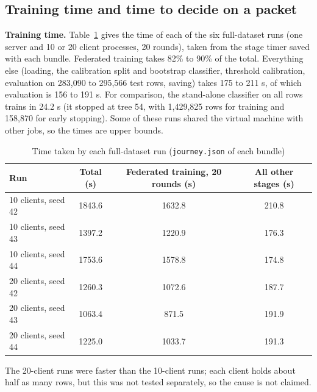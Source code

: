 \subsection{Training time and time to decide on a packet}\label{sec:speed}
\textbf{Training time.} Table~\ref{tab:traintime} gives the time of each of the six full-dataset runs (one server and 10 or 20 client processes, 20 rounds), taken from the stage timer saved with each bundle. Federated training takes 82\% to 90\% of the total. Everything else (loading, the calibration split and bootstrap classifier, threshold calibration, evaluation on 283{,}090 to 295{,}566 test rows, saving) takes 175 to 211 s, of which evaluation is 156 to 191 s. For comparison, the stand-alone classifier on all rows trains in 24.2 s (it stopped at tree 54, with 1{,}429{,}825 rows for training and 158{,}870 for early stopping). Some of these runs shared the virtual machine with other jobs, so the times are upper bounds.
\begin{table}[H]
\centering
\small
\renewcommand{\arraystretch}{1.15}
\begin{tabular}{|l|c|c|c|}
\hline
\textbf{Run} & \textbf{Total (s)} & \textbf{Federated training, 20 rounds (s)} & \textbf{All other stages (s)} \\ \hline
10 clients, seed 42 & 1843.6 & 1632.8 & 210.8 \\ \hline
10 clients, seed 43 & 1397.2 & 1220.9 & 176.3 \\ \hline
10 clients, seed 44 & 1753.6 & 1578.8 & 174.8 \\ \hline
20 clients, seed 42 & 1260.3 & 1072.6 & 187.7 \\ \hline
20 clients, seed 43 & 1063.4 & 871.5 & 191.9 \\ \hline
20 clients, seed 44 & 1225.0 & 1033.7 & 191.3 \\ \hline
\end{tabular}
\caption{Time taken by each full-dataset run (\texttt{journey.json} of each bundle)}
\label{tab:traintime}
\end{table}
The 20-client runs were faster than the 10-client runs; each client holds about half as many rows, but this was not tested separately, so the cause is not claimed.

